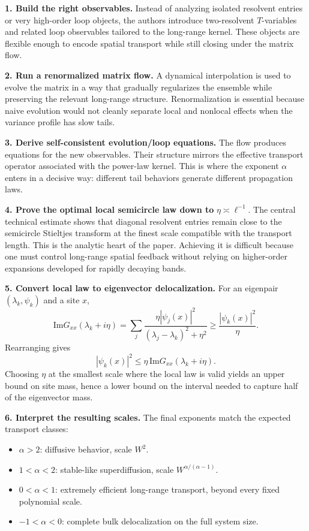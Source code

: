 \documentclass[11pt]{article}
\newcommand{\im}{\mathrm{Im}}
\begin{document}
\textbf{1. Build the right observables.}
Instead of analyzing isolated resolvent entries or very high-order loop objects, the authors introduce two-resolvent $T$-variables and related loop observables tailored to the long-range kernel. These objects are flexible enough to encode spatial transport while still closing under the matrix flow.

\textbf{2. Run a renormalized matrix flow.}
A dynamical interpolation is used to evolve the matrix in a way that gradually regularizes the ensemble while preserving the relevant long-range structure. Renormalization is essential because naive evolution would not cleanly separate local and nonlocal effects when the variance profile has slow tails.

\textbf{3. Derive self-consistent evolution/loop equations.}
The flow produces equations for the new observables. Their structure mirrors the effective transport operator associated with the power-law kernel. This is where the exponent $\alpha$ enters in a decisive way: different tail behaviors generate different propagation laws.

\textbf{4. Prove the optimal local semicircle law down to }$\eta\asymp \ell^{-1}$. 
The central technical estimate shows that diagonal resolvent entries remain close to the semicircle Stieltjes transform at the finest scale compatible with the transport length. This is the analytic heart of the paper. Achieving it is difficult because one must control long-range spatial feedback without relying on higher-order expansions developed for rapidly decaying bands.

\textbf{5. Convert local law to eigenvector delocalization.}
For an eigenpair $(\lambda_k,\psi_k)$ and a site $x$,
\[
\im G_{xx}(\lambda_k+i\eta)=\sum_j \frac{\eta |\psi_j(x)|^2}{(\lambda_j-\lambda_k)^2+\eta^2}
\ge \frac{|\psi_k(x)|^2}{\eta}.
\]
Rearranging gives
\[
|\psi_k(x)|^2 \le \eta \, \im G_{xx}(\lambda_k+i\eta).
\]
Choosing $\eta$ at the smallest scale where the local law is valid yields an upper bound on site mass, hence a lower bound on the interval needed to capture half of the eigenvector mass.

\textbf{6. Interpret the resulting scales.}
The final exponents match the expected transport classes:
\begin{itemize}[leftmargin=1.5em]
    \item $\alpha>2$: diffusive behavior, scale $W^2$.
    \item $1<\alpha<2$: stable-like superdiffusion, scale $W^{\alpha/(\alpha-1)}$.
    \item $0<\alpha<1$: extremely efficient long-range transport, beyond every fixed polynomial scale.
    \item $-1<\alpha<0$: complete bulk delocalization on the full system size.
\end{itemize}
\end{document}
